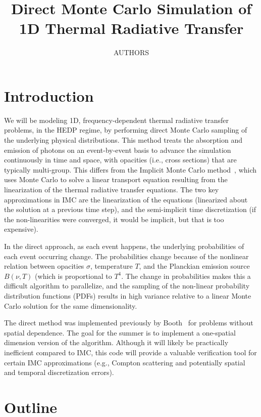 \documentclass{article}
\title{Direct Monte Carlo Simulation of 1D Thermal Radiative Transfer}
\author{AUTHORS}
\begin{document}
\doublespacing

\section{Introduction}

We will be modeling 1D, frequency-dependent thermal radiative transfer problems,
in the HEDP regime, by performing direct Monte Carlo sampling of
the underlying physical distributions.  This method treats the absorption and
emission of photons on an event-by-event basis to advance the simulation
continuously in time and space, with opacities (i.e., cross sections) that are typically
multi-group.  This differs from the Implicit Monte Carlo
method~\cite{wollaber_review,wollaber_thesis}, which uses Monte
Carlo to solve a linear transport equation resulting from the linearization of
the thermal radiative transfer equations.  The two key approximations in IMC are
the linearization of the equations (linearized about the solution at a previous
time step), and the semi-implicit time discretization (if the non-linearities
were converged, it would be implicit, but that is too expensive).  

In the direct approach, as each event happens, the underlying probabilities of
each event occurring change.  The probabilities change because of the nonlinear relation between opacities
$\sigma$, temperature $T$, and the Planckian emission source $B(\nu,T)$ (which
is proportional to $T^4$.  The change in probabilities makes
this a difficult algorithm to parallelize, and the sampling of the non-linear
probability distribution functions (PDFs) results in high variance relative to
a linear Monte Carlo solution for the same dimensionality.

The direct method was implemented previously by Booth~\cite{booth2011} for
problems without spatial dependence.  The
goal for the summer is to implement a one-spatial dimension version of the
algorithm.  Although it will likely be practically inefficient compared to IMC, this code
will provide a valuable verification tool for certain IMC approximations (e.g.,
Compton scattering and potentially spatial and temporal discretization errors).  

\section{Outline}
\end{document}
